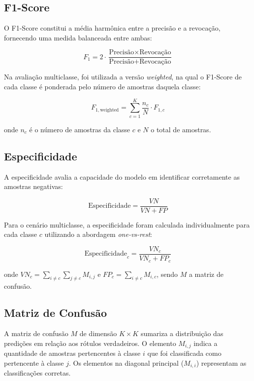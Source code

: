 \documentclass[12pt, a4paper]{article}
\begin{document}
\subsection{F1-Score}

O F1-Score constitui a média harmônica entre a precisão e a revocação, fornecendo uma medida balanceada entre ambas:

\begin{equation}
    F_1 = 2 \cdot \frac{\text{Precisão} \times \text{Revocação}}{\text{Precisão} + \text{Revocação}}
\end{equation}

Na avaliação multiclasse, foi utilizada a versão \textit{weighted}, na qual o F1-Score de cada classe é ponderada pelo número de amostras daquela classe:

\begin{equation}
    F_{1,\text{weighted}} = \sum_{c=1}^{K} \frac{n_c}{N} \cdot F_{1,c}
\end{equation}

onde $n_c$ é o número de amostras da classe $c$ e $N$ o total de amostras.

\subsection{Especificidade}

A especificidade avalia a capacidade do modelo em identificar corretamente as amostras negativas:

\begin{equation}
    \text{Especificidade} = \frac{VN}{VN + FP}
\end{equation}

Para o cenário multiclasse, a especificidade foram calculada individualmente para cada classe $c$ utilizando a abordagem \textit{one-vs-rest}:

\begin{equation}
    \text{Especificidade}_c = \frac{VN_c}{VN_c + FP_c}
\end{equation}

onde $VN_c = \sum_{i \neq c}\sum_{j \neq c} M_{i,j}$ e $FP_c = \sum_{i \neq c} M_{i,c}$, sendo $M$ a matriz de confusão.

\subsection{Matriz de Confusão}

A matriz de confusão $M$ de dimensão $K \times K$ sumariza a distribuição das predições em relação aos rótulos verdadeiros. O elemento $M_{i,j}$ indica a quantidade de amostras pertencentes à classe $i$ que foi classificada como pertencente à classe $j$. Os elementos na diagonal principal ($M_{i,i}$) representam as classificações corretas.
\end{document}
